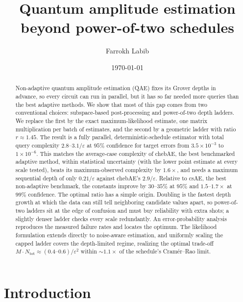 \documentclass[%
 twocolumn,
 amsmath,amssymb,
prx,
longbibliography
]{revtex4-2}
\begin{document}
\title{Quantum amplitude estimation beyond power-of-two schedules}

\author{Farrokh Labib}

\date{\today}

\begin{abstract}
Non-adaptive quantum amplitude estimation (QAE) fixes its Grover depths in advance, so every circuit can run in parallel, but it has so far needed more queries than the best adaptive methods. We show that most of this gap comes from two conventional choices: subspace-based post-processing and power-of-two depth ladders. We replace the first by the exact maximum-likelihood estimate, one matrix multiplication per batch of estimates, and the second by a geometric ladder with ratio $r \approx 1.45$. The result is a fully parallel, deterministic-schedule estimator with total query complexity $2.8$--$3.1/\varepsilon$ at $95\%$ confidence for target errors from $3.5\times 10^{-3}$ to $1\times 10^{-6}$. This matches the average-case complexity of chebAE, the best benchmarked adaptive method, within statistical uncertainty (with the lower point estimate at every scale tested), beats its maximum-observed complexity by $1.6\times$, and needs a maximum sequential depth of only $0.21/\varepsilon$ against chebAE's $2.9/\varepsilon$. Relative to csAE, the best non-adaptive benchmark, the constants improve by $30$--$35\%$ at $95\%$ and $1.5$--$1.7\times$ at $99\%$ confidence. The optimal ratio has a simple origin. Doubling is the fastest depth growth at which the data can still tell neighboring candidate values apart, so power-of-two ladders sit at the edge of confusion and must buy reliability with extra shots; a slightly denser ladder checks every scale redundantly. An error-probability analysis reproduces the measured failure rates and locates the optimum. The likelihood formulation extends directly to noise-aware estimation, and uniformly scaling the capped ladder covers the depth-limited regime, realizing the optimal trade-off $M \cdot N_{\mathrm{tot}} \approx (0.4\text{--}0.6)/\varepsilon^2$ within $\sim 1.1\times$ of the schedule's Cram\'er--Rao limit.
\end{abstract}

\maketitle

\section{Introduction}\label{sec:intro}
\end{document}
